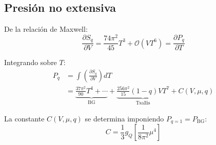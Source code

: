 \subsection{Presión no extensiva}\label{app:Tsallis-pressure}
De la relación de Maxwell:
\begin{equation}
\frac{\partial{S}_q}{\partial V} = \frac{74\pi^2}{45}T^3 + \mathcal{O}(V T^6) = \frac{\partial{P}_q}{\partial T}
\end{equation}

Integrando sobre $T$:
\begin{align}
{P}_q &= \int \left(\frac{\partial{S}_q}{\partial V}\right) dT \nonumber \\
&= \underbrace{\frac{37\pi^2}{90}T^4 + \cdots}_{\text{BG}} + \underbrace{\frac{256\pi^2}{15}(1-q)V T^7}_{\text{Tsallis}} + C(V,\mu,q)
\end{align}

La constante $C(V,\mu,q)$ se determina imponiendo ${P}_{q=1} = {P}_{\text{BG}}$:
\begin{equation}
C = \frac{1}{3}{g}_Q \left[\frac{1}{8\pi^2}\mu^4\right]
\end{equation}




